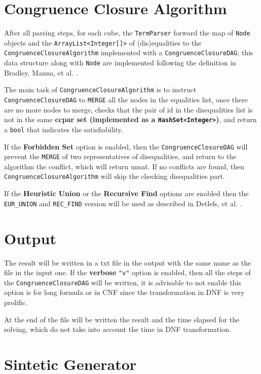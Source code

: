 \documentclass[11pt,a4paper]{article}
\begin{document}
    \section{Congruence Closure Algorithm}

    After all parsing steps, for each cube, the \texttt{TermParser} forward the map of \texttt{Node} objects and the \texttt{ArrayList<Integer[]>} of (dis)equalities to the \texttt{CongruenceClosureAlgorithm} implemented with a \texttt{CongruenceClosureDAG}; this data structure along with \texttt{Node} are implemented following the definition in Bradley, Manna, et al. \cite{calculusOfComputation}.

    The main task of \texttt{CongruenceClosureAlgorithm} is to instruct \texttt{CongruenceClosureDAG} to \texttt{MERGE} all the nodes in the equalities list, once there are no more nodes to merge, checks that the pair of id in the disequalities list is not in the same \textbf{ccpar set (implemented as a \texttt{HashSet<Integer>})}, and return a \texttt{bool} that indicates the satisfiability.

    If the \textbf{Forbidden Set} option is enabled, then the \texttt{CongruenceClosureDAG} will prevent the \texttt{MERGE} of two representatives of disequalities, and return to the algorithm the conflict, which will return unsat. If no conflicts are found, then \texttt{CongruenceClosureAlgorithm} will skip the checking disequalities part.

    If the \textbf{Heuristic Union} or the \textbf{Recursive Find} options are enabled then the \texttt{EUR\_UNION} and \texttt{REC\_FIND} version will be used as described in Detlefs, et al. \cite{simplify}.

    \section{Output}

    The result will be written in a txt file in the output with the same name as the file in the input one.
    If the \textbf{verbose} \texttt{"v"} option is enabled, then all the steps of the \texttt{CongruenceClosureDAG} will be written, it is advisable to not enable this option is for long formula or in CNF since the transformation in DNF is very prolific.
    
    At the end of the file will be written the result and the time elapsed for the solving, which do not take into account the time in DNF transformation.

    \section{Sintetic Generator}
\end{document}

